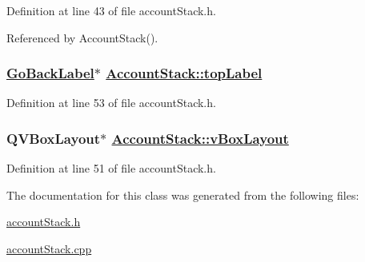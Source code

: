 Definition at line 43 of file account\-Stack.h.

Referenced by Account\-Stack().\hypertarget{classAccountStack_r7}{
\subsubsection[topLabel]{\setlength{\rightskip}{0pt plus 5cm}\hyperlink{classGoBackLabel}{Go\-Back\-Label}$\ast$ \hyperlink{classAccountStack_r7}{Account\-Stack::top\-Label}}}
\label{classAccountStack_r7}


Definition at line 53 of file account\-Stack.h.\hypertarget{classAccountStack_r5}{
\subsubsection[vBoxLayout]{\setlength{\rightskip}{0pt plus 5cm}QVBox\-Layout$\ast$ \hyperlink{classAccountStack_r5}{Account\-Stack::v\-Box\-Layout}}}
\label{classAccountStack_r5}


Definition at line 51 of file account\-Stack.h.

The documentation for this class was generated from the following files:\begin{CompactItemize}
\item 
\hyperlink{accountStack_8h}{account\-Stack.h}\item 
\hyperlink{accountStack_8cpp}{account\-Stack.cpp}\end{CompactItemize}
